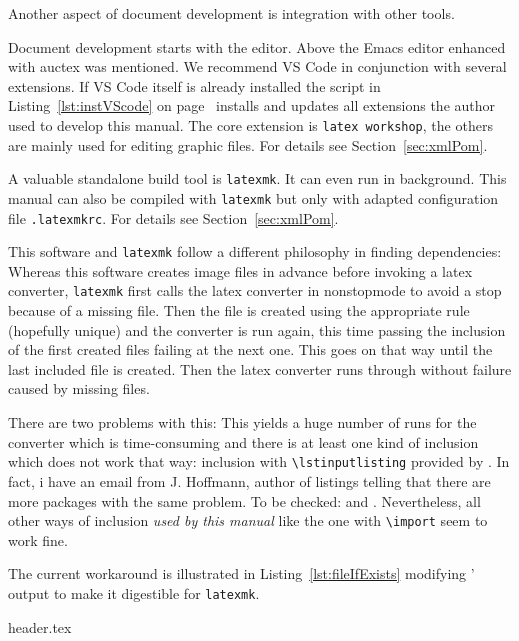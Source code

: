 Another aspect of document development is integration with other tools. 

Document development starts with the editor. 
Above the Emacs editor enhanced with auctex was mentioned. 
We recommend VS Code in conjunction with several extensions. 
If VS Code itself is already installed 
the script in Listing~\ref{lst:instVScode} on page~\pageref{lst:instVScode}  
installs and updates all extensions 
the author used to develop this manual. 
The core extension is \texttt{latex workshop}, 
the others are mainly used for editing graphic files. 
For details see Section~\ref{sec:xmlPom}. 




A valuable standalone build tool is \texttt{latexmk}. 
It can even run in background. 
This manual can also be compiled with \texttt{latexmk} 
but only with adapted configuration file \texttt{.latexmkrc}. 
For details see Section~\ref{sec:xmlPom}. 




This software and \texttt{latexmk} follow a different philosophy in finding dependencies: 
Whereas this software creates image files in advance before invoking a latex converter, 
\texttt{latexmk} first calls the latex converter in nonstopmode 
to avoid a stop because of a missing file. 
Then the file is created using the appropriate rule (hopefully unique) 
and the converter is run again, 
this time passing the inclusion of the first created files 
failing at the next one. 
This goes on that way until the last included file is created. 
Then the latex converter runs through without failure caused by missing files. 

There are two problems with this: 
This yields a huge number of runs for the converter 
which is time-consuming 
and there is at least one kind of inclusion which does not work that way: 
inclusion with \texttt{\textbackslash{}lstinputlisting} 
provided by . 
In fact, i have an email from J. Hoffmann, author of listings 
telling that there are more packages with the same problem. 
To be checked:  and . 
Nevertheless, all other ways of inclusion \emph{used by this manual} 
like the one with \texttt{\textbackslash{}import} 
seem to work fine. 

The current workaround is illustrated in Listing~\ref{lst:fileIfExists} 
modifying ' output to make it digestible for \texttt{latexmk}. 

%
{header.tex}

